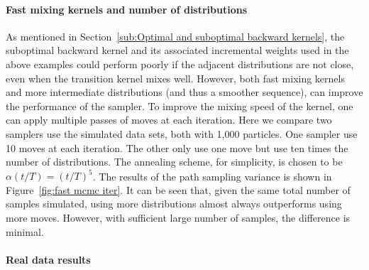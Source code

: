 \paragraph{Fast mixing \mcmc kernels and number of distributions}

As mentioned in Section~\ref{sub:Optimal and suboptimal backward kernels}, the
suboptimal backward kernel and its associated incremental weights used in the
above examples could perform poorly if the adjacent distributions are not
close, even when the transition kernel mixes well. However, both fast mixing
kernels and more intermediate distributions (and thus a smoother sequence),
can improve the performance of the sampler. To improve the mixing speed of the
kernel, one can apply multiple passes of \mcmc moves at each iteration. Here
we compare two samplers use the simulated data sets, both with 1,000 particles.
One sampler use 10 \mcmc moves at each iteration. The other only use one \mcmc
move but use ten times the number of distributions. The annealing scheme, for
simplicity, is chosen to be $\alpha(t/T) = (t/T)^5$. The results of the path
sampling variance is shown in Figure~\ref{fig:fast mcmc iter}. It can be seen
that, given the same total number of samples simulated, using more
distributions almost always outperforms using more \mcmc moves. However, with
sufficient large number of samples, the difference is minimal.



\paragraph{Real data results}

